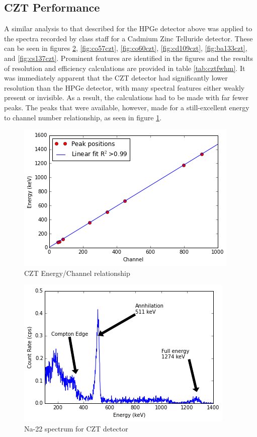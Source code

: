 \documentclass[12pt]{article}
\begin{document}
\subsection{CZT Performance}
A similar analysis to that described for the HPGe detector above was applied to the spectra recorded by class staff for a Cadmium Zinc Telluride detector. These can be seen in figures \ref{fig:na22czt}, \ref{fig:co57czt}, \ref{fig:co60czt}, \ref{fig:cd109czt}, \ref{fig:ba133czt}, and \ref{fig:cs137czt}. Prominent features are identified in the figures and the results of resolution and efficiency calculations are provided in table \ref{tab:cztfwhm}. It was immediately apparent that the CZT detector had significantly lower resolution than the HPGe detector, with many spectral features either weakly present or invisible. As a result, the calculations had to be made with far fewer peaks. The peaks that were available, however, made for a still-excellent energy to channel number relationship, as seen in figure \ref{fig:cztenergy}.

\begin{center}
\begin{figure}
	\includegraphics{czt_energy_linearity}
	\caption{CZT Energy/Channel relationship}
	\label{fig:cztenergy}
\end{figure}
\end{center}

\begin{center}
\begin{figure}
	\includegraphics{czt_na22}
	\caption{Na-22 spectrum for CZT detector}
	\label{fig:na22czt}
\end{figure}
\end{center}
\end{document}
